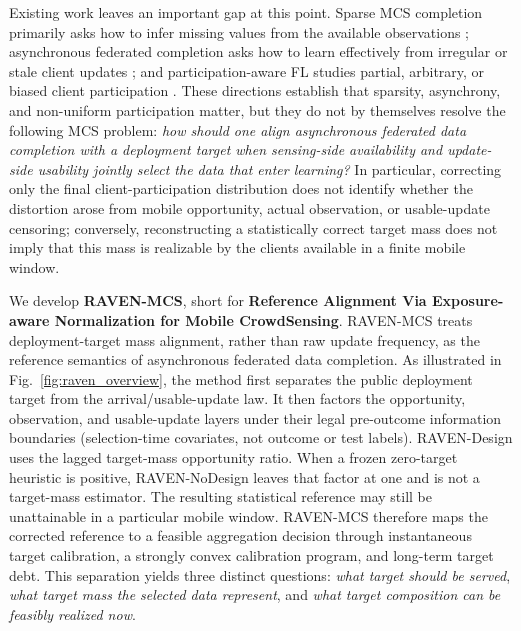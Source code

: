 \documentclass[letterpaper,journal]{IEEEtran}
\begin{document}
Existing work leaves an important gap at this point.  Sparse MCS completion
primarily asks how to infer missing values from the available observations
\cite{wang2023spatiotemporal,li2024robust}; asynchronous federated completion
asks how to learn effectively from irregular or stale client updates
\cite{wang2026federated,sun2024staleness}; and participation-aware FL studies
partial, arbitrary, or biased client participation
\cite{wang2022unified,jhunjhunwala2022fedvarp,wu2023anchor,wang2024lightweight,sun2025debiasing,mohri2019agnostic,chen2026fedcure,morishita2026who}.
These directions establish that sparsity, asynchrony, and non-uniform
participation matter, but they do not by themselves resolve the following MCS
problem: \emph{how should one align asynchronous federated data completion with
a deployment target when sensing-side availability and update-side usability
jointly select the data that enter learning?}  In particular, correcting only
the final client-participation distribution does not identify whether the
distortion arose from mobile opportunity, actual observation, or usable-update
censoring; conversely, reconstructing a statistically correct target mass does
not imply that this mass is realizable by the clients available in a finite
mobile window.

We develop \textbf{RAVEN-MCS}, short for
\textbf{Reference Alignment Via Exposure-aware Normalization for Mobile
CrowdSensing}.  RAVEN-MCS treats deployment-target mass alignment, rather than raw
update frequency, as the reference semantics of asynchronous federated data
completion.  As illustrated in Fig.~\ref{fig:raven_overview}, the method first
separates the public deployment target from the arrival/usable-update law.  It
then factors the opportunity, observation, and usable-update layers under
their legal pre-outcome information boundaries (selection-time covariates,
not outcome or test labels).  RAVEN-Design uses the lagged target-mass
opportunity ratio.  When a frozen zero-target heuristic is
positive, RAVEN-NoDesign leaves that factor at one and is not a
target-mass estimator.
The resulting statistical reference may still be unattainable in a particular
mobile window.  RAVEN-MCS therefore maps the corrected reference to a feasible
aggregation decision through instantaneous target calibration, a strongly
convex calibration program, and long-term target debt.
This separation yields three distinct questions:
\emph{what target should be served}, \emph{what target mass the selected data
represent}, and \emph{what target composition can be feasibly realized now}.
\end{document}
